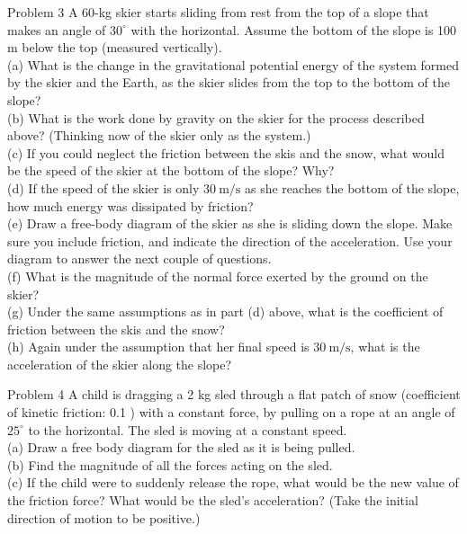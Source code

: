 \documentclass[10pt]{article}
\begin{document}
Problem 3 A 60-kg skier starts sliding from rest from the top of a slope that makes an angle of $30^{\circ}$ with the horizontal. Assume the bottom of the slope is 100 m below the top (measured vertically).\\
(a) What is the change in the gravitational potential energy of the system formed by the skier and the Earth, as the skier slides from the top to the bottom of the slope?\\
(b) What is the work done by gravity on the skier for the process described above? (Thinking now of the skier only as the system.)\\
(c) If you could neglect the friction between the skis and the snow, what would be the speed of the skier at the bottom of the slope? Why?\\
(d) If the speed of the skier is only $30 \mathrm{~m} / \mathrm{s}$ as she reaches the bottom of the slope, how much energy was dissipated by friction?\\
(e) Draw a free-body diagram of the skier as she is sliding down the slope. Make sure you include friction, and indicate the direction of the acceleration. Use your diagram to answer the next couple of questions.\\
(f) What is the magnitude of the normal force exerted by the ground on the skier?\\
(g) Under the same assumptions as in part (d) above, what is the coefficient of friction between the skis and the snow?\\
(h) Again under the assumption that her final speed is $30 \mathrm{~m} / \mathrm{s}$, what is the acceleration of the skier along the slope?

Problem 4 A child is dragging a 2 kg sled through a flat patch of snow (coefficient of kinetic friction: 0.1 ) with a constant force, by pulling on a rope at an angle of $25^{\circ}$ to the horizontal. The sled is moving at a constant speed.\\
(a) Draw a free body diagram for the sled as it is being pulled.\\
(b) Find the magnitude of all the forces acting on the sled.\\
(c) If the child were to suddenly release the rope, what would be the new value of the friction force? What would be the sled's acceleration? (Take the initial direction of motion to be positive.)
\end{document}
